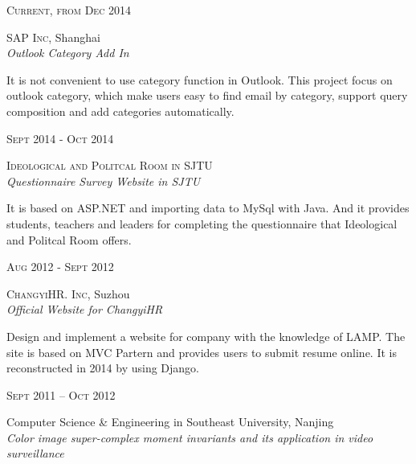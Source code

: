 \documentclass[UTF8,10pt]{article} %
\begin{document}
{\begin{minipage}[t]{0.5\textwidth}
{\raggedleft\textsc{Current, from Dec 2014}\par}

{\raggedright\large \textsc{SAP Inc}, Shanghai\\
\textit{Outlook Category Add In}\\[8pt]}

\normalsize{It is not convenient to use category function in Outlook. This project focus on outlook category, 
which make users easy to find email by category, support query composition and add categories
automatically. }\\


{\raggedleft\textsc{Sept 2014 - Oct 2014}\par}

{\raggedright\large \textsc{Ideological and Politcal Room in SJTU}\\
\textit{Questionnaire Survey Website in SJTU}\\[5pt]}

\normalsize{It is based on ASP.NET and  importing data to MySql with Java. 
And it provides students, teachers and leaders for completing the questionnaire that Ideological and Politcal Room
 offers.}\\


{\raggedleft\textsc{Aug 2012 - Sept 2012}\par}

{\raggedright\large \textsc{ChangyiHR. Inc}, Suzhou\\
\textit{Official Website for ChangyiHR}\\[5pt]}

\normalsize{Design and implement a website for company with the knowledge of LAMP. The site is based on MVC 
Partern and provides users to submit resume online. It is reconstructed in 2014 by using Django.}\\


{\raggedleft\textsc{Sept 2011 -- Oct 2012}\par}

{\raggedright\large Computer Science \& Engineering in Southeast University, Nanjing\\
\textit{Color image super-complex moment invariants and its application in video surveillance}\\[5pt]}


\end{minipage}}
\end{document}
